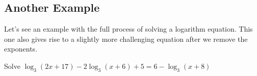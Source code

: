 \subsection{Another Example} 
Let's see an example with the full process of solving a logarithm equation. This one also gives rise to a slightly more challenging equation after we remove the exponents.
\begin{Example}
Solve $\log_3(2x+17)-2\log_3(x+6)+5=6-\log_3(x+8)$
\end{Example}
\fillpaper
